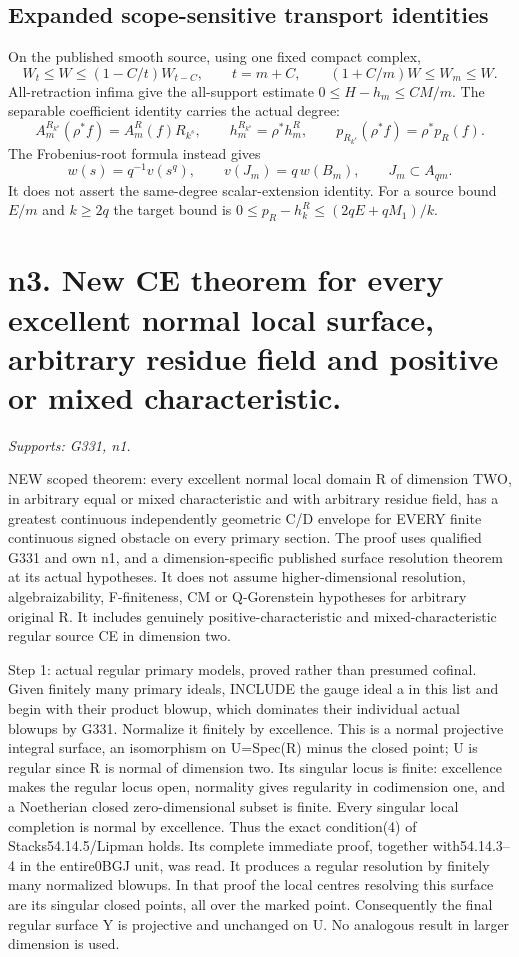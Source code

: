 \documentclass[11pt]{article}
\begin{document}
\subsection*{Expanded scope-sensitive transport identities}
On the published smooth source, using one fixed compact complex,
\[
 W_t\le W\le(1-C/t)W_{t-C},\qquad t=m+C,
 \qquad (1+C/m)W\le W_m\le W.
\]
All-retraction infima give the all-support estimate
$0\le H-h_m\le CM/m$.
The separable coefficient identity carries the actual degree:
\[
 A_m^{R_{k^s}}(\rho^*f)=A_m^R(f)R_{k^s},\qquad
 h_m^{R_{k^s}}=\rho^*h_m^R,\qquad
 p_{R_{k^s}}(\rho^*f)=\rho^*p_R(f).
\]
The Frobenius-root formula instead gives
\[
 w(s)=q^{-1}v(s^q),\qquad v(J_m)=q\,w(B_m),\qquad
 J_m\subset A_{qm}.
\]
It does not assert the same-degree scalar-extension identity.
For a source bound $E/m$ and $k\ge2q$ the target bound is
$0\le p_R-h_k^R\le(2qE+qM_1)/k$.

\section{n3. New CE theorem for every excellent normal local surface, arbitrary residue field and positive or mixed characteristic.}
\textit{Supports: G331, n1.}

NEW scoped theorem: every excellent normal local domain R of dimension TWO, in arbitrary equal or mixed characteristic and with arbitrary residue field, has a greatest continuous independently geometric C/D envelope for EVERY finite continuous signed obstacle on every primary section. The proof uses qualified G331 and own n1, and a dimension-specific published surface resolution theorem at its actual hypotheses. It does not assume higher-dimensional resolution, algebraizability, F-finiteness, CM or Q-Gorenstein hypotheses for arbitrary original R. It includes genuinely positive-characteristic and mixed-characteristic regular source CE in dimension two.

Step 1: actual regular primary models, proved rather than presumed cofinal. Given finitely many primary ideals, INCLUDE the gauge ideal a in this list and begin with their product blowup, which dominates their individual actual blowups by G331. Normalize it finitely by excellence. This is a normal projective integral surface, an isomorphism on U=Spec(R) minus the closed point; U is regular since R is normal of dimension two. Its singular locus is finite: excellence makes the regular locus open, normality gives regularity in codimension one, and a Noetherian closed zero-dimensional subset is finite. Every singular local completion is normal by excellence. Thus the exact condition(4) of Stacks54.14.5/Lipman holds. Its complete immediate proof, together with54.14.3--4 in the entire0BGJ unit, was read. It produces a regular resolution by finitely many normalized blowups. In that proof the local centres resolving this surface are its singular closed points, all over the marked point. Consequently the final regular surface Y is projective and unchanged on U. No analogous result in larger dimension is used.
\end{document}
